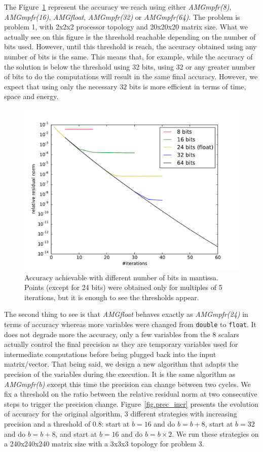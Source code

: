 \documentclass[10pt,conference]{IEEEtran}
\begin{document}
   The Figure~\ref{fig.bits_accuracy} represent the accuracy we reach using either \emph{AMGmpfr(8)}, \emph{AMGmpfr(16)}, \emph{AMGfloat}, \emph{AMGmpfr(32)} or \emph{AMGmpfr(64)}. The problem is problem 1, with 2x2x2 processor topology and 20x20x20 matrix size.
   What we actually see on this figure is the threshold reachable depending on the number of bits used. However, until this threshold is reach, the accuracy obtained using any number of bits is the same. This means that, for example,
   while the accuracy of the solution is below the threshold using 32 bits, using 32 or any greater number of bits to do the computations will result in the same final accuracy. However, we expect that using only the necessary $32$ bits is 
   more efficient in terms of time, space and energy.
   
   \begin{figure} \centering
    \includegraphics[width=0.8\linewidth]{figs/bits_convergence.pdf}
    \caption{Accuracy achievable with different number of bits in mantissa. Points (except for 24 bits) were obtained only for multiples of 5 iterations, but it is enough to see the thresholds appear.}
    \label{fig.bits_accuracy}
   \end{figure}
   
   The second thing to see is that \emph{AMGfloat} behaves exactly as \emph{AMGmpfr(24)} in terms of accuracy whereas more variables were changed from \texttt{double} to \texttt{float}. It does not degrade more the accuracy, only a few variables
   from the 8 scalars actually control the final precision as they are temporary variables used for intermediate computations before being plugged back into the input matrix/vector.
   That being said, we design a new algorithm that adapts the precision of the variables during the execution. It is the same algorithm as \emph{AMGmpfr(b)} except this time the precision can change between two cycles.
   We fix a threshold on the ratio between the relative residual norm at two consecutive steps to trigger the precision change.
   Figure~\ref{fig.prec_incr} presents the evolution of accuracy for the original algorithm, 3 different strategies with increasing precision and a threshold of 0.8: start at $b=16$ and do $b=b+8$, start at $b=32$
   and do $b=b+8$, and start at $b=16$ and do $b=b\times2$. We run these strategies on a 240x240x240 matrix size with a 3x3x3 topology for problem 3.
   
\end{document}
